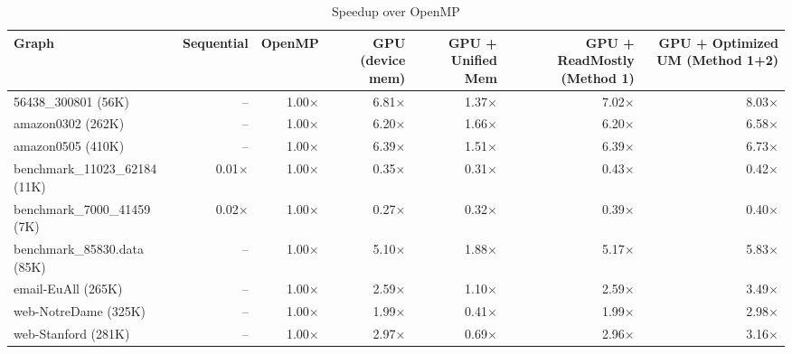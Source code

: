 \begin{table}[h]
\centering
\caption{Speedup over OpenMP}
\label{tab:speedup_vs_OpenMP}
\begin{tabular}{lrrrrrr}
\hline
Graph & Sequential & OpenMP & GPU (device mem) & GPU + Unified Mem & GPU + ReadMostly (Method 1) & GPU + Optimized UM (Method 1+2) \\
\hline
56438_300801 (56K) & -- & 1.00$\times$ & 6.81$\times$ & 1.37$\times$ & 7.02$\times$ & 8.03$\times$ \\
amazon0302 (262K) & -- & 1.00$\times$ & 6.20$\times$ & 1.66$\times$ & 6.20$\times$ & 6.58$\times$ \\
amazon0505 (410K) & -- & 1.00$\times$ & 6.39$\times$ & 1.51$\times$ & 6.39$\times$ & 6.73$\times$ \\
benchmark_11023_62184 (11K) & 0.01$\times$ & 1.00$\times$ & 0.35$\times$ & 0.31$\times$ & 0.43$\times$ & 0.42$\times$ \\
benchmark_7000_41459 (7K) & 0.02$\times$ & 1.00$\times$ & 0.27$\times$ & 0.32$\times$ & 0.39$\times$ & 0.40$\times$ \\
benchmark_85830.data (85K) & -- & 1.00$\times$ & 5.10$\times$ & 1.88$\times$ & 5.17$\times$ & 5.83$\times$ \\
email-EuAll (265K) & -- & 1.00$\times$ & 2.59$\times$ & 1.10$\times$ & 2.59$\times$ & 3.49$\times$ \\
web-NotreDame (325K) & -- & 1.00$\times$ & 1.99$\times$ & 0.41$\times$ & 1.99$\times$ & 2.98$\times$ \\
web-Stanford (281K) & -- & 1.00$\times$ & 2.97$\times$ & 0.69$\times$ & 2.96$\times$ & 3.16$\times$ \\
\hline
\end{tabular}
\end{table}
